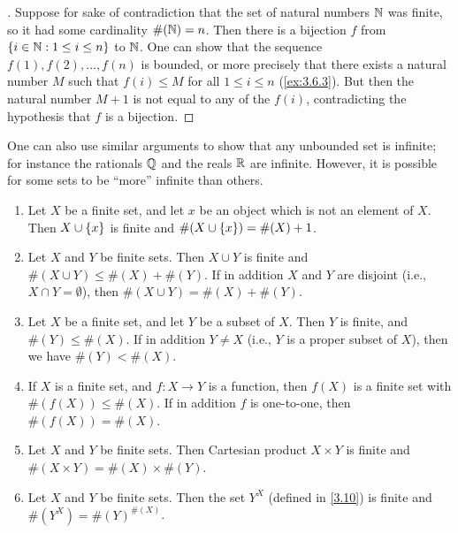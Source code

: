 \begin{proof}[]
	Suppose for sake of contradiction that the set of natural numbers \(\mathbb{N}\) was finite, so it had some cardinality \(\#(\mathbb{N}) = n\).
	Then there is a bijection \(f\) from \(\left\lbrace i \in \mathbb{N} : 1 \leq i \leq n\right\rbrace\) to \(\mathbb{N}\).
	One can show that the sequence \(f(1), f(2), \dots, f(n)\) is bounded, or more precisely that there exists a natural number \(M\) such that \(f(i) \leq M\) for all \(1 \leq i \leq n\) (\cref{ex:3.6.3}).
	But then the natural number \(M+1\) is not equal to any of the \(f(i)\), contradicting the hypothesis that \(f\) is a bijection.
\end{proof}

\begin{rmk}\label{3.6.13}
	One can also use similar arguments to show that any unbounded set is infinite;
	for instance the rationals \(\mathbb{Q}\) and the reals \(\mathbb{R}\) are infinite.
	However, it is possible for some sets to be ``more'' infinite than others.
\end{rmk}

\begin{prop}\label{3.6.14}
	\leavevmode
	\begin{enumerate}
		\item Let \(X\) be a finite set, and let \(x\) be an object which is not an element of \(X\).
		      Then \(X \cup \left\lbrace x\right\rbrace\) is finite and \(\#(X \cup \left\lbrace x\right\rbrace) = \#(X) + 1\).
		\item Let \(X\) and \(Y\) be finite sets.
		      Then \(X \cup Y\) is finite and \(\#(X \cup Y) \leq \#(X) + \#(Y)\).
		      If in addition \(X\) and \(Y\) are disjoint (i.e., \(X \cap Y = \emptyset\)), then \(\#(X \cup Y) = \#(X) + \#(Y)\).
		\item Let \(X\) be a finite set, and let \(Y\) be a subset of \(X\).
		      Then \(Y\) is finite, and \(\#(Y) \leq \#(X)\).
		      If in addition \(Y \neq X\) (i.e., \(Y\) is a proper subset of \(X\)), then we have \(\#(Y) < \#(X)\).
		\item If \(X\) is a finite set, and \(f : X \to Y\) is a function, then \(f(X)\) is a finite set with \(\#(f(X)) \leq \#(X)\).
		      If in addition \(f\) is one-to-one, then \(\#(f(X)) = \#(X)\).
		\item Let \(X\) and \(Y\) be finite sets.
		      Then Cartesian product \(X \times Y\) is finite and \(\#(X \times Y) = \#(X) \times \#(Y)\).
		\item Let \(X\) and \(Y\) be finite sets.
		      Then the set \(Y^X\) (defined in \cref{3.10}) is finite and \(\#(Y^X) = \#(Y)^{\#(X)}\).
	\end{enumerate}
\end{prop}

